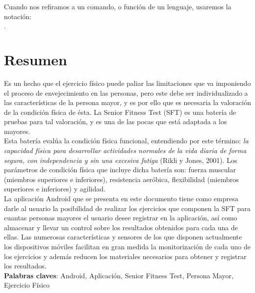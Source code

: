 Cuando nos refiramos a un comando, o función de un lenguaje, usaremos
la notación: \\ .\\

\cleardoublepage

\section*{Resumen}

Es un hecho que el ejercicio físico puede paliar las limitaciones que va imponiendo el proceso de envejecimiento en las personas, pero este debe ser individualizado a las características de la persona mayor, y es por ello que es necesaria la valoración de la condición física de ésta. La Senior Fitness Test (SFT) es una batería de pruebas para tal valoración, y es una de las pocas que está adaptada a los mayores.\\

Esta batería evalúa la condición física funcional, entendiendo por este término: \textit{la capacidad física para desarrollar actividades normales de la vida diaria de forma segura, con independencia y sin una excesiva fatiga} (Rikli y Jones, 2001). Los parámetros de condición física que incluye dicha batería son: fuerza muscular (miembros superiores e inferiores), resistencia aeróbica, flexibilidad (miembros superiores e inferiores) y agilidad.\\

La aplicación Android que se presenta en este documento tiene como empresa darle al usuario la posibilidad de realizar los ejercicios que componen la SFT para cuantas personas mayores el usuario desee registrar en la aplicación, así como almacenar y llevar un control sobre los resultados obtenidos para cada una de ellas. Las numerosas características y sensores de los que disponen actualmente los dispositivos móviles facilitan en gran medida la monitorización de cada uno de los ejercicios y además reducen los materiales necesarios para obtener y registrar los resultados.\\

\textbf{Palabras claves}: Android, Aplicación, Senior Fitness Test, Persona Mayor, Ejercicio Físico